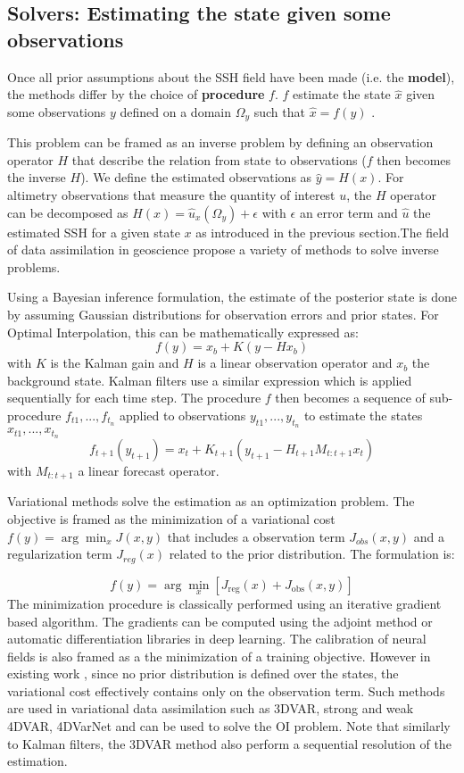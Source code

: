 \begin{bibunit}
\section{Solvers: Estimating the state given some observations}

Once all prior assumptions about the SSH field have been made (i.e. the \textbf{model}), the methods differ by the choice of \textbf{procedure}  $f$. $f$ estimate the state $\hat{x}$ given some observations $y$ defined on a domain $\Omega_y$ such that $\hat{x}=f(y)$ .

This problem can be framed as an inverse problem by defining an observation operator $H$ that describe the relation from state to observations ($f$ then becomes the inverse $H$).
We define the estimated observations as $\hat{y} = H(x)$. For altimetry observations that measure the quantity of interest $u$, the $H$ operator can be decomposed as $H(x) = \hat{u}_x(\Omega_y) + \epsilon$ with $\epsilon$ an error term and $\hat{u}$ the estimated SSH for a given state $x$ as introduced in the previous section.The field of data assimilation in geoscience propose a variety of methods to solve inverse problems.

Using a Bayesian inference formulation, the estimate of the posterior state is done by assuming Gaussian distributions for observation errors and prior states. 
For Optimal Interpolation, this can be mathematically expressed as:
 $$f(y)= x_b + K(y - Hx_b)$$
with $K$ is the Kalman gain and $H$ is a linear observation operator and $x_b$ the background state.
Kalman filters use a similar expression which is applied sequentially for each time step.
The procedure $f$ then becomes a sequence of sub-procedure $f_{t1}, ..., f_{t_n}$ applied to observations $y_{t1}, ..., y_{t_n}$ to estimate the states $x_{t1}, ..., x_{t_n}$ 
$$f_{t+1}(y_{t+1})= x_{t} + K_{t+1}(y_{t+1} - H_{t+1}M_{t:t+1}x_{t})$$
 with $M_{t:t+1}$ a linear forecast operator.


Variational methods solve the estimation as an optimization problem. The objective is framed as the minimization of a variational cost $f(y) = \arg\min_x J(x, y)$ that includes a observation term $J_{obs}(x, y)$ and a regularization term  $J_{reg}(x)$ related to the prior distribution. The formulation is:

$$ f(y) = \arg\min_x \left[ J_{\text{reg}}(x) + J_{\text{obs}}(x, y) \right]$$
The minimization procedure is classically performed using an iterative gradient based algorithm\cite{}. The gradients can be computed using the adjoint method or automatic differentiation libraries in deep learning\cite{}.
The calibration of neural fields is also framed as a the minimization of a training objective. However in existing work \cite{}, since no prior distribution is defined over the states, the variational cost effectively contains only on the observation term.
Such methods are used in variational data assimilation such as 3DVAR, strong and weak 4DVAR, 4DVarNet and can be used to solve the OI problem. Note that similarly to Kalman filters, the 3DVAR method also perform a sequential resolution of the estimation.



\end{bibunit}
